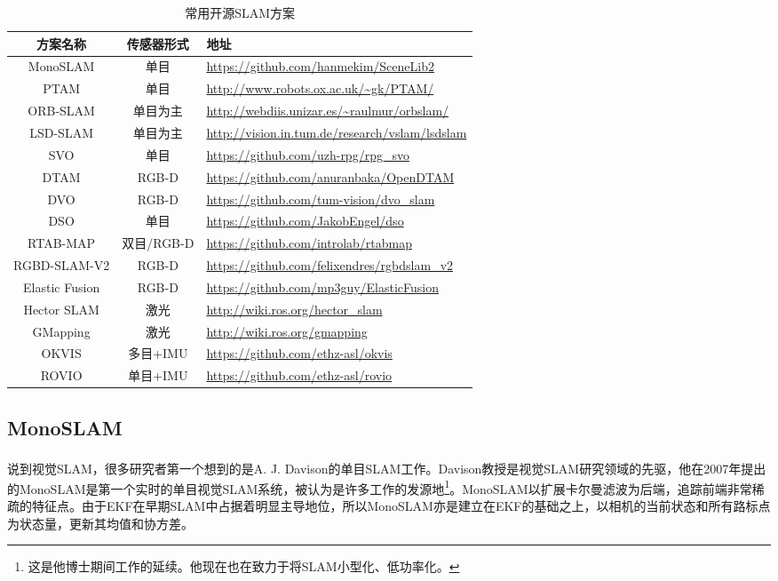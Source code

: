 {
\small
\begin{table}[!h]
\caption{常用开源SLAM方案}
\label{table:opensource-slam}
\begin{tabu}{@{}c|c|X@{}}
\toprule
	方案名称 & 传感器形式 & 地址 \\
\midrule
	MonoSLAM &  单目 & \url{https://github.com/hanmekim/SceneLib2}  \\ 
	PTAM & 单目 & \url{http://www.robots.ox.ac.uk/~gk/PTAM/} \\ 
	ORB-SLAM & 单目为主 & \url{http://webdiis.unizar.es/~raulmur/orbslam/} \\ 
	LSD-SLAM & 单目为主 & \url{http://vision.in.tum.de/research/vslam/lsdslam} \smallskip \\
	SVO & 单目 & \url{https://github.com/uzh-rpg/rpg_svo} \\ 
	DTAM & RGB-D & \url{https://github.com/anuranbaka/OpenDTAM} \\ 
	DVO & RGB-D & \url{https://github.com/tum-vision/dvo_slam} \\ 
	DSO & 单目 & \url{https://github.com/JakobEngel/dso} \\
	RTAB-MAP & 双目/RGB-D & \url{https://github.com/introlab/rtabmap} \\ 
	RGBD-SLAM-V2 & RGB-D & \url{https://github.com/felixendres/rgbdslam_v2} \\ 
	Elastic Fusion & RGB-D & \url{https://github.com/mp3guy/ElasticFusion} \\ 
	Hector SLAM & 激光 & \url{http://wiki.ros.org/hector_slam} \\ 
	GMapping & 激光 & \url{http://wiki.ros.org/gmapping} \\ 
	OKVIS & 多目+IMU & \url{https://github.com/ethz-asl/okvis} \\ 
	ROVIO & 单目+IMU & \url{https://github.com/ethz-asl/rovio} \\ 
\bottomrule
\end{tabu}
\end{table}
}

\smallskip
\subsection{MonoSLAM}
说到视觉SLAM，很多研究者第一个想到的是A. J. Davison的单目SLAM工作\textsuperscript{\cite{Davison2007,Davison2003}}。Davison教授是视觉SLAM研究领域的先驱，他在2007年提出的MonoSLAM是第一个实时的单目视觉SLAM系统\textsuperscript{\cite{Davison2007}}，被认为是许多工作的发源地\footnote{这是他博士期间工作的延续。他现在也在致力于将SLAM小型化、低功率化。}。MonoSLAM以扩展卡尔曼滤波为后端，追踪前端非常稀疏的特征点。由于EKF在早期SLAM中占据着明显主导地位，所以MonoSLAM亦是建立在EKF的基础之上，以相机的当前状态和所有路标点为状态量，更新其均值和协方差。


